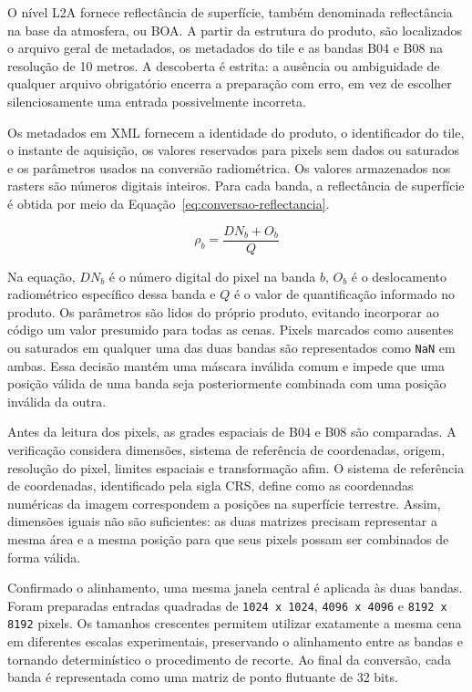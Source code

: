 \documentclass[tcc,capa]{texufpel}
\begin{document}
O nível L2A fornece reflectância de superfície, também denominada reflectância na
base da atmosfera, ou BOA. A partir da estrutura do produto, são localizados o
arquivo geral de metadados, os metadados do tile e as bandas B04 e B08 na resolução
de 10 metros. A descoberta é estrita: a ausência ou ambiguidade de qualquer arquivo
obrigatório encerra a preparação com erro, em vez de escolher silenciosamente uma
entrada possivelmente incorreta.

Os metadados em XML fornecem a identidade do produto, o identificador do tile, o
instante de aquisição, os valores reservados para pixels sem dados ou saturados e
os parâmetros usados na conversão radiométrica. Os valores armazenados nos rasters
são números digitais inteiros. Para cada banda, a reflectância de superfície é
obtida por meio da Equação~\ref{eq:conversao-reflectancia}.

\begin{equation}
\label{eq:conversao-reflectancia}
\rho_b = \frac{DN_b + O_b}{Q}
\end{equation}

Na equação, $DN_b$ é o número digital do pixel na banda $b$, $O_b$ é o deslocamento
radiométrico específico dessa banda e $Q$ é o valor de quantificação informado no
produto. Os parâmetros são lidos do próprio produto, evitando incorporar ao código
um valor presumido para todas as cenas. Pixels marcados como ausentes ou saturados
em qualquer uma das duas bandas são representados como \texttt{NaN} em ambas. Essa
decisão mantém uma máscara inválida comum e impede que uma posição válida de uma
banda seja posteriormente combinada com uma posição inválida da outra.

Antes da leitura dos pixels, as grades espaciais de B04 e B08 são comparadas. A
verificação considera dimensões, sistema de referência de coordenadas, origem,
resolução do pixel, limites espaciais e transformação afim. O sistema de referência
de coordenadas, identificado pela sigla CRS, define como as coordenadas numéricas da
imagem correspondem a posições na superfície terrestre. Assim, dimensões iguais não
são suficientes: as duas matrizes precisam representar a mesma área e a mesma
posição para que seus pixels possam ser combinados de forma válida.

Confirmado o alinhamento, uma mesma janela central é aplicada às duas bandas. Foram
preparadas entradas quadradas de \texttt{1024 x 1024}, \texttt{4096 x 4096} e
\texttt{8192 x 8192} pixels. Os tamanhos crescentes permitem utilizar exatamente a
mesma cena em diferentes escalas experimentais, preservando o alinhamento entre as
bandas e tornando determinístico o procedimento de recorte. Ao final da conversão,
cada banda é representada como uma matriz de ponto flutuante de 32 bits.
\end{document}
